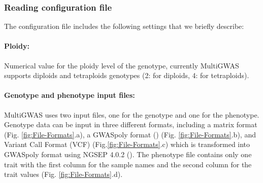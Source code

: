 \documentclass{article}
\begin{document}
\subsubsection{Reading configuration file\label{section-Reading-configuration-file}}

The configuration file includes the following settings that we briefly describe:

\paragraph{{Ploidy:}} Numerical value for the ploidy level of the genotype, currently MultiGWAS supports diploids and tetraploids genotypes (2: for diploids, 4: for tetraploids).



\paragraph{Genotype and phenotype input files:}

MultiGWAS uses two input files, one for the genotype and one for the phenotype. Genotype data can be input in three different formats, including a matrix format (Fig. \ref{fig:File-Formats}.a), a GWASpoly format (\cite{Rosyara2016}) (Fig. \ref{fig:File-Formats}.b), and Variant Call Format (VCF) (Fig.\ref{fig:File-Formats}.c) which is transformed into GWASpoly format using NGSEP 4.0.2 (\cite{Duitama2019}). The phenotype file contains only one trait with the first column for the sample names and the second column for the trait values (Fig. \ref{fig:File-Formats}.d).
\end{document}
